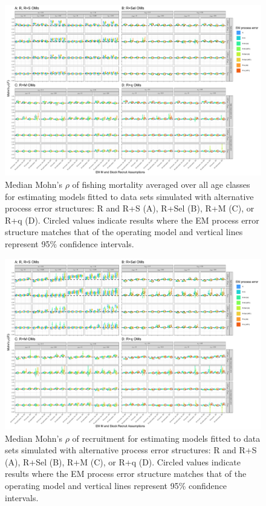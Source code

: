 \documentclass[
  12pt,
]{article}
\begin{document}
\begin{landscape}
\begin{figure}
\begin{center}
\includegraphics{mohns_rho_F_plots}
\end{center}
\caption{Median Mohn's $\rho$ of fishing mortality averaged over all age classes for estimating models fitted to data sets simulated with alternative process error structures: R and R+S (A), R+Sel (B), R+M (C), or R+q (D). Circled values indicate results where the EM process error structure matches that of the operating model and vertical lines represent 95\% confidence intervals.}\label{mohns_rho_F}
\end{figure}
\end{landscape}

\begin{landscape}
\begin{figure}
\begin{center}
\includegraphics{mohns_rho_R_plots}
\end{center}
\caption{Median Mohn's $\rho$ of recruitment for estimating models fitted to data sets simulated with alternative process error structures: R and R+S (A), R+Sel (B), R+M (C), or R+q (D). Circled values indicate results where the EM process error structure matches that of the operating model and vertical lines represent 95\% confidence intervals.}\label{mohns_rho_F}
\end{figure}
\end{landscape}
\end{document}
